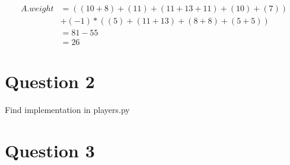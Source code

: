 \documentclass{article}
\begin{document}
\begin{align*}
A.weight & = ((10 + 8) + (11) + (11 + 13 + 11) + (10) + (7)) \\
         & + (-1) * ((5) + (11 + 13) + (8 + 8) + (5 + 5)) \\
         & = 81 - 55 \\
         & = 26 
\end{align*}

\section{Question 2}

Find implementation in players.py

\section{Question 3}
\end{document}
